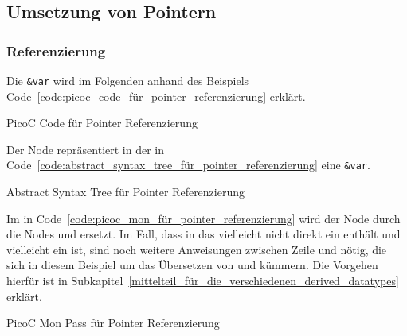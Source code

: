 
\subsection{Umsetzung von Pointern}
\subsubsection{Referenzierung}
Die  \verb|&var| wird im Folgenden anhand des Beispiels Code~\ref{code:picoc_code_für_pointer_referenzierung} erklärt.

\begin{code}
  \centering
  \caption{PicoC Code für Pointer Referenzierung}
  \label{code:picoc_code_für_pointer_referenzierung}
\end{code}

Der Node  repräsentiert in der  in Code~\ref{code:abstract_syntax_tree_für_pointer_referenzierung} eine  \verb|&var|.

\begin{code}
  \centering
  \caption{Abstract Syntax Tree für Pointer Referenzierung}
  \label{code:abstract_syntax_tree_für_pointer_referenzierung}
\end{code}

Im  in Code~\ref{code:picoc_mon_für_pointer_referenzierung} wird der Node  durch die Nodes  und  ersetzt. Im Fall, dass in  das  vielleicht nicht direkt ein  enthält und  vielleicht ein  ist, sind noch weitere Anweisungen zwischen Zeile  und   nötig, die sich in diesem Beispiel um das Übersetzen von  und  kümmern. Die Vorgehen hierfür ist in Subkapitel~\ref{mittelteil_für_die_verschiedenen_derived_datatypes} erklärt.

\begin{code}
  \centering
  \caption{PicoC Mon Pass für Pointer Referenzierung}
  \label{code:picoc_mon_für_pointer_referenzierung}
\end{code}

